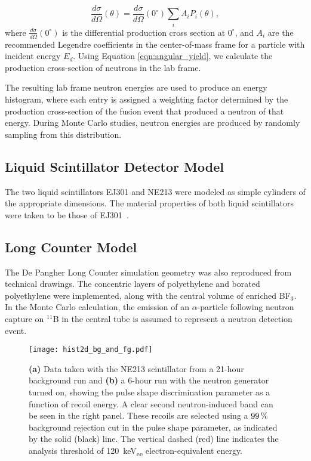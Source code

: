 \begin{equation}\label{eqn:angular_yield}
\frac{d \sigma}{d \Omega}(\theta) = \frac{d \sigma}{d \Omega}(0^{\circ}) \sum\limits_{i} A_i P_i(\theta)  ,
\end{equation}
where $\frac{d \sigma}{d \Omega}(0^{\circ})$ is the differential production cross section at $0^{\circ}$, and $A_i$ are the recommended Legendre coefficients in the center-of-mass frame for a particle with incident energy $E_d$. Using Equation \ref{eqn:angular_yield}, we calculate the production cross-section of neutrons in the lab frame.

The resulting lab frame neutron energies are used to produce an energy histogram, where each entry is assigned a weighting factor determined by the production cross-section of the fusion event that produced a neutron of that energy. During Monte Carlo studies, neutron energies are produced by randomly sampling from this distribution.


\subsection{Liquid Scintillator Detector Model}

The two liquid scintillators EJ301 and NE213 were modeled as simple cylinders of the appropriate dimensions. The material properties of both liquid scintillators were taken to be those of EJ301~\cite{Eljen}.

\subsection{Long Counter Model}

The De Pangher Long Counter simulation geometry was also reproduced from technical drawings. The concentric layers of polyethylene and borated polyethylene were implemented, along with the central volume of enriched BF$_3$. In the Monte Carlo calculation, the emission of an $\alpha$-particle following neutron capture on $^{11}$B in the central tube is assumed to represent a neutron detection event.

\begin{figure*}[!htbp]
\centering
\texttt{[image: hist2d\_bg\_and\_fg.pdf]}
\caption{{\bf (a)} Data taken with the NE213 scintillator from a 21-hour background run and {\bf (b)} a 6-hour run with the neutron generator turned on, showing the pulse shape discrimination parameter as a function of recoil energy. A clear second neutron-induced band can be seen in the right panel. These recoils are selected using a $99\, \mathrm{\%}$ background rejection cut in the pulse shape parameter, as indicated by the solid (black) line.
The vertical dashed (red) line indicates the analysis threshold of \SI{120}{keV_{ee}} electron-equivalent energy.}
\label{hist2d}
\end{figure*}

